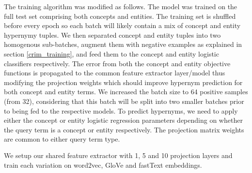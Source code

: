 The training algorithm was modified as follows.  The model was trained on the full test set comprising both concepts and entities.  The training set is shuffled before every epoch so each batch will likely contain a mix of concept and entity hypernymy tuples.  We then separated concept and entity tuples into two homogenous sub-batches, augment them with negative examples as explained in section \ref{crim_training}, and feed them to the concept and entity logistic classifiers respectively.  The error from both the concept and entity objective functions is propagated to the common feature extractor layer/model thus modifying the projection weights which should improve hypernym prediction for both concept and entity terms.  We increased the batch size to 64 positive samples (from 32), considering that this batch will be split into two smaller batches prior to being fed to the respective models.  To predict hypernyms, we need to apply either the concept or entity logistic regression parameters depending on whether the query term is a concept or entity respectively.  The projection matrix weights are common to either query term type.

We setup our shared feature extractor with 1, 5 and 10 projection layers and train each variation on word2vec, GloVe and fastText embeddings.